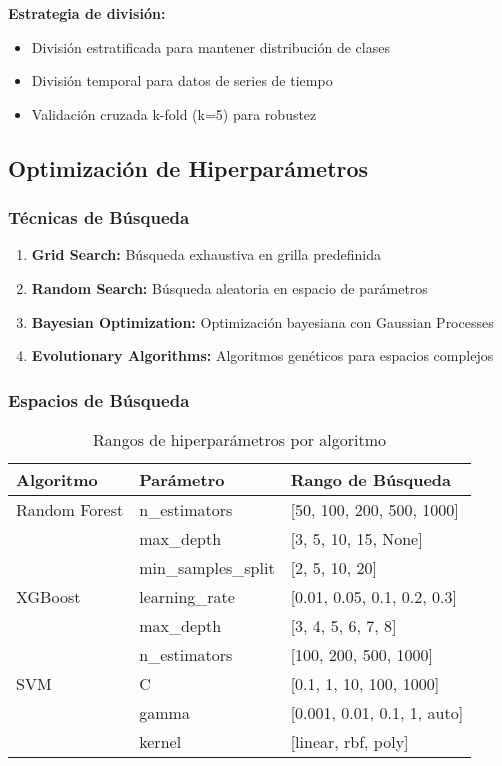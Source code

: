 \textbf{Estrategia de división:}
\begin{itemize}
    \item División estratificada para mantener distribución de clases
    \item División temporal para datos de series de tiempo
    \item Validación cruzada k-fold (k=5) para robustez
\end{itemize}

\subsection{Optimización de Hiperparámetros}

\subsubsection{Técnicas de Búsqueda}

\begin{enumerate}
    \item \textbf{Grid Search:} Búsqueda exhaustiva en grilla predefinida
    \item \textbf{Random Search:} Búsqueda aleatoria en espacio de parámetros
    \item \textbf{Bayesian Optimization:} Optimización bayesiana con Gaussian Processes
    \item \textbf{Evolutionary Algorithms:} Algoritmos genéticos para espacios complejos
\end{enumerate}

\subsubsection{Espacios de Búsqueda}

\begin{table}[htbp]
\centering
\caption{Rangos de hiperparámetros por algoritmo}
\begin{tabular}{@{}p{3cm}p{4cm}p{6cm}@{}}
\toprule
\textbf{Algoritmo} & \textbf{Parámetro} & \textbf{Rango de Búsqueda} \\
\midrule
Random Forest & n\_estimators & [50, 100, 200, 500, 1000] \\
 & max\_depth & [3, 5, 10, 15, None] \\
 & min\_samples\_split & [2, 5, 10, 20] \\
\midrule
XGBoost & learning\_rate & [0.01, 0.05, 0.1, 0.2, 0.3] \\
 & max\_depth & [3, 4, 5, 6, 7, 8] \\
 & n\_estimators & [100, 200, 500, 1000] \\
\midrule
SVM & C & [0.1, 1, 10, 100, 1000] \\
 & gamma & [0.001, 0.01, 0.1, 1, auto] \\
 & kernel & [linear, rbf, poly] \\
\bottomrule
\end{tabular}
\label{tab:hiperparametros}
\end{table}

